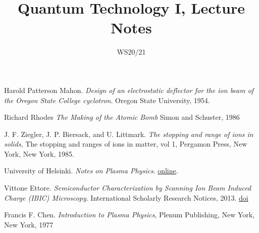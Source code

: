 \documentclass[10pt, a4paper]{memoir}
\title{Quantum Technology I, Lecture Notes}
\date{WS20/21}
\begin{document}
\maketitle
\frontmatter
\tableofcontents*


\mainmatter












\begin{thebibliography}{9}

Harold Patterson Mahon.
\textit{Design of an electrostatic deflector for the ion beam of the Oregon State College cyclotron}.
Oregon State University, 1954.

Richard Rhodes
\textit{The Making of the Atomic Bomb}
Simon and Schuster, 1986

J. F. Ziegler, J. P. Biersack, and U. Littmark.
\textit{The stopping and range of ions in solids},
The stopping and ranges of ions in matter, vol 1,
Pergamon Press, New York, New York, 1985.

University of Helsinki.
\textit{Notes on Plasma Physics}.
\href{http://beam.helsinki.fi/~knordlun/mdh/rangetext.html}{online}.

Vittone Ettore.
\textit{Semiconductor Characterization by Scanning Ion Beam Induced Charge (IBIC) Microscopy}.
International Scholarly Research Notices, 2013.
\href{https://doi.org/10.1155/2013/637608}{doi}

Francis F. Chen.
\textit{Introduction to Plasma Physics},
Plenum Publishing, New York, New York, 1977

\end{thebibliography}
\end{document}
